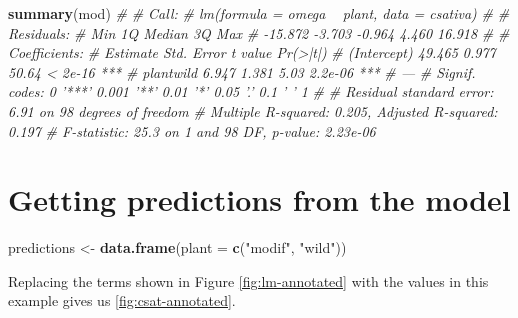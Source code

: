 \documentclass[
]{book}
\newenvironment{Shaded}{\begin{snugshade}}{\end{snugshade}}
\newcommand{\CommentTok}[1]{\textcolor[rgb]{0.56,0.35,0.01}{\textit{#1}}}
\newcommand{\DataTypeTok}[1]{\textcolor[rgb]{0.13,0.29,0.53}{#1}}
\newcommand{\KeywordTok}[1]{\textcolor[rgb]{0.13,0.29,0.53}{\textbf{#1}}}
\newcommand{\NormalTok}[1]{#1}
\newcommand{\OperatorTok}[1]{\textcolor[rgb]{0.81,0.36,0.00}{\textbf{#1}}}
\newcommand{\StringTok}[1]{\textcolor[rgb]{0.31,0.60,0.02}{#1}}
\begin{document}
\begin{Shaded}
\begin{Highlighting}[]
\KeywordTok{summary}\NormalTok{(mod)}
\CommentTok{# }
\CommentTok{# Call:}
\CommentTok{# lm(formula = omega ~ plant, data = csativa)}
\CommentTok{# }
\CommentTok{# Residuals:}
\CommentTok{#     Min      1Q  Median      3Q     Max }
\CommentTok{# -15.872  -3.703  -0.964   4.460  16.918 }
\CommentTok{# }
\CommentTok{# Coefficients:}
\CommentTok{#             Estimate Std. Error t value Pr(>|t|)    }
\CommentTok{# (Intercept)   49.465      0.977   50.64  < 2e-16 ***}
\CommentTok{# plantwild      6.947      1.381    5.03  2.2e-06 ***}
\CommentTok{# ---}
\CommentTok{# Signif. codes:  0 '***' 0.001 '**' 0.01 '*' 0.05 '.' 0.1 ' ' 1}
\CommentTok{# }
\CommentTok{# Residual standard error: 6.91 on 98 degrees of freedom}
\CommentTok{# Multiple R-squared:  0.205,   Adjusted R-squared:  0.197 }
\CommentTok{# F-statistic: 25.3 on 1 and 98 DF,  p-value: 2.23e-06}
\end{Highlighting}
\end{Shaded}

\hypertarget{getting-predictions-from-the-model-1}{%
\section{Getting predictions from the model}\label{getting-predictions-from-the-model-1}}

\begin{Shaded}
\begin{Highlighting}[]
\NormalTok{predictions <-}\StringTok{ }\KeywordTok{data.frame}\NormalTok{(}\DataTypeTok{plant =} \KeywordTok{c}\NormalTok{(}\StringTok{"modif"}\NormalTok{, }\StringTok{"wild"}\NormalTok{))}
\end{Highlighting}
\end{Shaded}

\begin{Shaded}
\end{Shaded}

Replacing the terms shown in Figure \ref{fig:lm-annotated} with the values in this example gives us \ref{fig:csat-annotated}.
\end{document}
